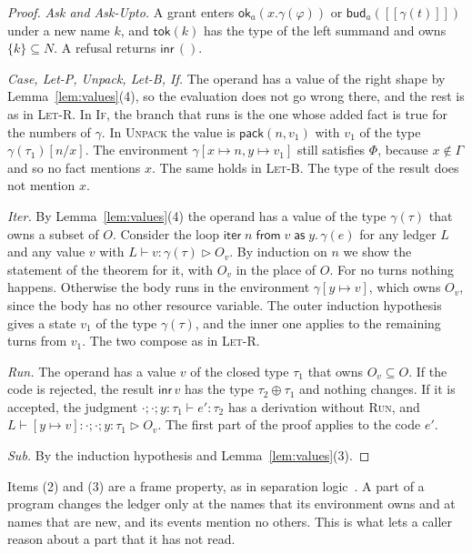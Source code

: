 \documentclass[acmsmall,nonacm,screen]{acmart}
\newcommand{\kw}[1]{\mathsf{#1}}
\newcommand{\ok}[2]{\kw{ok}_{#1}(#2)}
\newcommand{\bud}[2]{\kw{bud}_{#1}(#2)}
\newcommand{\iter}[4]{\kw{iter}\;#1\;\kw{from}\;#2\;\kw{as}\;#3.\,#4}
\newcommand{\pack}[2]{\kw{pack}(#1, #2)}
\newcommand{\inr}{\kw{inr}\,}
\newcommand{\tok}[1]{\kw{tok}(#1)}
\newcommand{\sem}[1]{[\![#1]\!]}
\newcommand{\own}{\mathrel{\triangleright}}
\begin{document}
\begin{proof}
\emph{Ask and Ask-Upto.} A grant enters $\ok{a}{x.\gamma(\varphi)}$ or
$\bud{a}{\sem{\gamma(t)}}$ under a new name $k$, and $\tok{k}$ has the type of the left
summand and owns $\{k\} \subseteq N$. A refusal returns $\inr()$.

\emph{Case, Let-P, Unpack, Let-B, If.} The operand has a value of the right shape by
Lemma~\ref{lem:values}(4), so the evaluation does not go wrong there, and the rest is as in
\textsc{Let-R}. In \textsc{If}, the branch that runs is the one whose added fact is true for
the numbers of $\gamma$. In \textsc{Unpack} the value is $\pack{n}{v_1}$ with $v_1$ of the type
$\gamma(\tau_1)[n/x]$. The environment $\gamma[x \mapsto n, y \mapsto v_1]$ still satisfies
$\Phi$, because $x \notin \Gamma$ and so no fact mentions $x$. The same holds in
\textsc{Let-B}. The type of the result does not mention $x$.

\emph{Iter.} By Lemma~\ref{lem:values}(4) the operand has a value of the type $\gamma(\tau)$
that owns a subset of $O$. Consider the loop $\iter{n}{v}{y}{\gamma(e)}$ for any ledger $L$
and any value $v$ with $L \vdash v : \gamma(\tau) \own O_v$. By induction on $n$ we show the statement of
the theorem for it, with $O_v$ in the place of $O$. For no turns nothing happens. Otherwise the body runs in the environment $\gamma[y \mapsto v]$, which owns $O_v$,
since the body has no other resource variable. The outer induction hypothesis gives a state
$v_1$ of the type $\gamma(\tau)$, and the inner one applies to the remaining turns from $v_1$.
The two compose as in \textsc{Let-R}.

\emph{Run.} The operand has a value $v$ of the closed type $\tau_1$ that owns
$O_v \subseteq O$. If the code is rejected, the result $\inr v$ has the type
$\tau_2 \oplus \tau_1$ and nothing changes. If it is accepted, the judgment
$\cdot; \cdot; y{:}\tau_1 \vdash e' : \tau_2$ has a derivation without \textsc{Run}, and
$L \vdash [y \mapsto v] : \cdot; \cdot; y{:}\tau_1 \own O_v$. The first part of the proof
applies to the code $e'$.

\emph{Sub.} By the induction hypothesis and Lemma~\ref{lem:values}(3).
\end{proof}

Items (2) and (3) are a frame property, as in separation logic~\citep{reynolds2002}. A part of
a program changes the ledger only at the names that its environment owns and at names that are
new, and its events mention no others. This is what lets a caller reason about a part that it
has not read.
\end{document}
